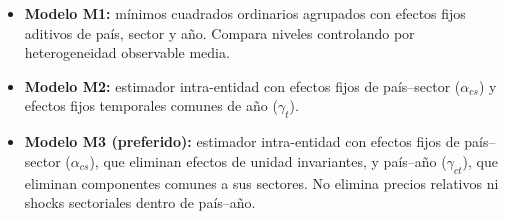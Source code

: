 \documentclass[12pt,a4paper]{article}
\begin{document}
\begin{itemize}

    \item \textbf{Modelo M1:} mínimos cuadrados ordinarios agrupados con efectos fijos aditivos de país, sector y año. Compara niveles controlando por heterogeneidad observable media.

    \item \textbf{Modelo M2:} estimador intra-entidad con efectos fijos de país--sector ($\alpha_{cs}$) y efectos fijos temporales comunes de año ($\gamma_t$).

    \item \textbf{Modelo M3 (preferido):} estimador intra-entidad con efectos fijos de país--sector ($\alpha_{cs}$), que eliminan efectos de unidad invariantes, y país--año ($\gamma_{ct}$), que eliminan componentes comunes a sus sectores. No elimina precios relativos ni shocks sectoriales dentro de país--año.

\end{itemize}
\end{document}
